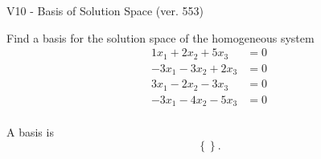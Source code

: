 \begin{exercise}
  \begin{exerciseTitle}V10 - Basis of Solution Space (ver. 553)\end{exerciseTitle}
  \begin{exerciseStatement}
    Find a basis for the solution space of the homogeneous system 
\begin{align*}
 1 x_ 1 + 2 x_ 2 + 5 x_ 3 &= 0  \\ 
  -3 x_ 1 -3 x_ 2 + 2 x_ 3 &= 0  \\ 
  3 x_ 1 -2 x_ 2 -3 x_ 3 &= 0  \\ 
  -3 x_ 1 -4 x_ 2 -5 x_ 3 &= 0  \\ 
 \end{align*}


 
  \end{exerciseStatement}

  \begin{exerciseAnswer}
   A basis is   
\[\left\{\right\}.\]

  


  \end{exerciseAnswer}
\end{exercise}